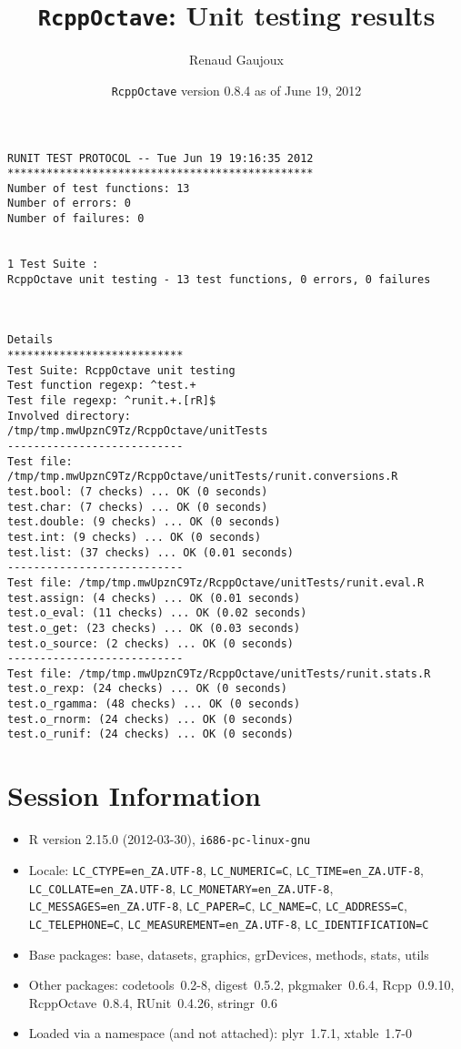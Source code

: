 \documentclass[10pt]{article}
\author{Renaud Gaujoux}
\title{\texttt{RcppOctave}: Unit testing results}
\date{\texttt{RcppOctave} version 0.8.4 as of June 19, 2012}
\begin{document}
\maketitle

\begin{verbatim}
RUNIT TEST PROTOCOL -- Tue Jun 19 19:16:35 2012 
*********************************************** 
Number of test functions: 13 
Number of errors: 0 
Number of failures: 0 

 
1 Test Suite : 
RcppOctave unit testing - 13 test functions, 0 errors, 0 failures



Details 
*************************** 
Test Suite: RcppOctave unit testing 
Test function regexp: ^test.+ 
Test file regexp: ^runit.+.[rR]$ 
Involved directory: 
/tmp/tmp.mwUpznC9Tz/RcppOctave/unitTests 
--------------------------- 
Test file: /tmp/tmp.mwUpznC9Tz/RcppOctave/unitTests/runit.conversions.R 
test.bool: (7 checks) ... OK (0 seconds)
test.char: (7 checks) ... OK (0 seconds)
test.double: (9 checks) ... OK (0 seconds)
test.int: (9 checks) ... OK (0 seconds)
test.list: (37 checks) ... OK (0.01 seconds)
--------------------------- 
Test file: /tmp/tmp.mwUpznC9Tz/RcppOctave/unitTests/runit.eval.R 
test.assign: (4 checks) ... OK (0.01 seconds)
test.o_eval: (11 checks) ... OK (0.02 seconds)
test.o_get: (23 checks) ... OK (0.03 seconds)
test.o_source: (2 checks) ... OK (0 seconds)
--------------------------- 
Test file: /tmp/tmp.mwUpznC9Tz/RcppOctave/unitTests/runit.stats.R 
test.o_rexp: (24 checks) ... OK (0 seconds)
test.o_rgamma: (48 checks) ... OK (0 seconds)
test.o_rnorm: (24 checks) ... OK (0 seconds)
test.o_runif: (24 checks) ... OK (0 seconds)
\end{verbatim}

\section*{Session Information}
\begin{itemize}\raggedright
  \item R version 2.15.0 (2012-03-30), \verb|i686-pc-linux-gnu|
  \item Locale: \verb|LC_CTYPE=en_ZA.UTF-8|, \verb|LC_NUMERIC=C|, \verb|LC_TIME=en_ZA.UTF-8|, \verb|LC_COLLATE=en_ZA.UTF-8|, \verb|LC_MONETARY=en_ZA.UTF-8|, \verb|LC_MESSAGES=en_ZA.UTF-8|, \verb|LC_PAPER=C|, \verb|LC_NAME=C|, \verb|LC_ADDRESS=C|, \verb|LC_TELEPHONE=C|, \verb|LC_MEASUREMENT=en_ZA.UTF-8|, \verb|LC_IDENTIFICATION=C|
  \item Base packages: base, datasets, graphics, grDevices, methods,
    stats, utils
  \item Other packages: codetools~0.2-8, digest~0.5.2, pkgmaker~0.6.4,
    Rcpp~0.9.10, RcppOctave~0.8.4, RUnit~0.4.26, stringr~0.6
  \item Loaded via a namespace (and not attached): plyr~1.7.1,
    xtable~1.7-0
\end{itemize}
\end{document}
